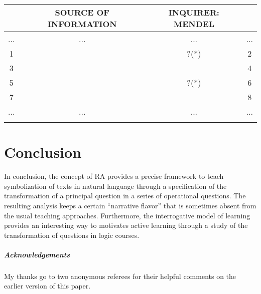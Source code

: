 \documentclass[a4paper,UKenglish]{lipics}
\begin{document}
	\begin{table*}[htbp]
\begin{tabular}{cccc}
 
 \\
 &SOURCE OF INFORMATION&INQUIRER: MENDEL&\\ \hline
 ... & ... & ... & ... \\ \hline
 1 &  & ?(*) & 2 \\ \hline
 3 &  & & 4\\ \hline
 5 &  & ?(*) & 6\\ \hline
 7 &  & & 8\\ \hline
 ... & ... & ... & ...\\ \hline
 \\
 \end{tabular}
\end{table*}
	
	
\section{Conclusion}

In conclusion, the concept of RA provides a precise framework to teach symbolization of texts in natural language through a specification of the transformation of a principal question in a series of operational questions. The resulting analysis keeps a certain “narrative flavor” that is sometimes absent from the usual teaching approaches. Furthermore, the interrogative model of learning provides an interesting way to motivates active learning through a study of the transformation of questions in logic courses.
























\subparagraph*{Acknowledgements}

My thanks go to two anonymous referees for their helpful comments on the earlier version of this paper.
\end{document}
